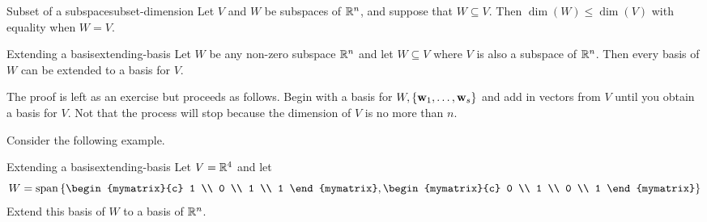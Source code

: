 \begin{theorem}{Subset of a subspace}{subset-dimension}
  Let $V$ and $W$ be subspaces of $\mathbb{R}^n$, and suppose that
  $W\subseteq V$.  Then $\dim(W) \leq \dim(V)$ with equality when
  $W=V$.
\end{theorem}

\begin{theorem}{Extending a basis}{extending-basis}
  Let $W$ be any non-zero subspace $\mathbb{R}^{n}$ and let $W\subseteq V$
  where $V$ is also a subspace of $\mathbb{R}^{n}$. Then every basis of $W$
  can be extended to a basis for $V$.
\end{theorem}

The proof is left as an exercise but proceeds as follows. Begin with a
basis for $W,\left\{\mbox{\bf w}_{1},\ldots ,\mbox{\bf w}_{s}\right\} $ and add in
vectors from $V$ until you obtain a basis for $V$.  Not that the
process will stop because the dimension of $V$ is no more than $n$.

Consider the following example.

\begin{example}{Extending a basis}{extending-basis}
  Let $V=\mathbb{R}^{4}$ and let 
  \begin{equation*}
    W=\sspan\set{
      \begin{mymatrix}{c} 1 \\ 0 \\ 1 \\ 1 \end{mymatrix},
      \begin{mymatrix}{c} 0 \\ 1 \\ 0 \\ 1 \end{mymatrix}
    }
  \end{equation*}
  Extend this basis of $W$ to a basis of $\mathbb{R}^{n}$.
\end{example}

